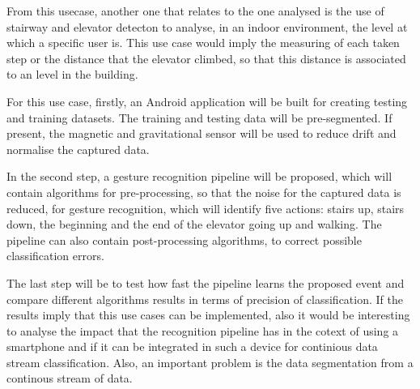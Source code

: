 From this usecase, another one that relates to the one analysed is the use of stairway and elevator detecton to analyse, in an indoor environment, the level at which a specific user is. This use case would imply the measuring of each taken step or the distance that the elevator climbed, so that this distance is associated to an level in the building. 

For this use case, firstly, an Android application will be built for creating testing and training datasets. The training and testing data will be pre-segmented. If present, the magnetic and gravitational sensor will be used to reduce drift and normalise the captured data.

In the second step, a gesture recognition pipeline will be proposed, which will contain algorithms for pre-processing, so that the noise for the captured data is reduced, for gesture recognition, which will identify five actions: stairs up, stairs down, the beginning and the end of the elevator going up and walking. The pipeline can also contain post-processing algorithms, to correct possible classification errors.

The last step will be to test how fast the pipeline learns the proposed event and compare different algorithms results in terms of precision of classification. If the results imply that this use cases can be implemented, also it would be interesting to analyse the impact that the recognition pipeline has in the cotext of using a smartphone and if it can be integrated in such a device for continious data stream classification. Also, an important problem is the data segmentation from a continous stream of data.

